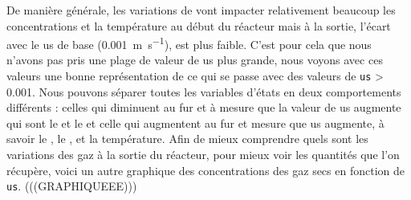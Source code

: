 \documentclass[11pt]{report}
\begin{document}
            De manière générale, les variations de  vont impacter relativement beaucoup 
            les concentrations et la température au début du réacteur mais à la sortie,
            l'écart avec le us de base (\SI{0.001}{\meter\per\second}), est plus faible. C'est pour cela que 
            nous n'avons pas pris une plage de valeur de us plus grande, nous voyons avec 
            ces valeurs une bonne représentation de ce qui se passe avec des valeurs de 
            \verb|us| > 0.001. Nous pouvons séparer toutes les variables d'états en deux comportements 
            différents : celles qui diminuent au fur et à mesure que la valeur de us augmente
            qui sont le  et le  et celle qui augmentent au fur et mesure que us augmente, 
            à savoir le , le , et la température.
            Afin de mieux comprendre quels sont les variations des gaz à la sortie du réacteur, 
            pour mieux voir les quantités que l'on récupère,
            voici un autre graphique des concentrations des gaz secs en fonction de \verb|us|.
            (((GRAPHIQUEEE)))
        
\end{document}
